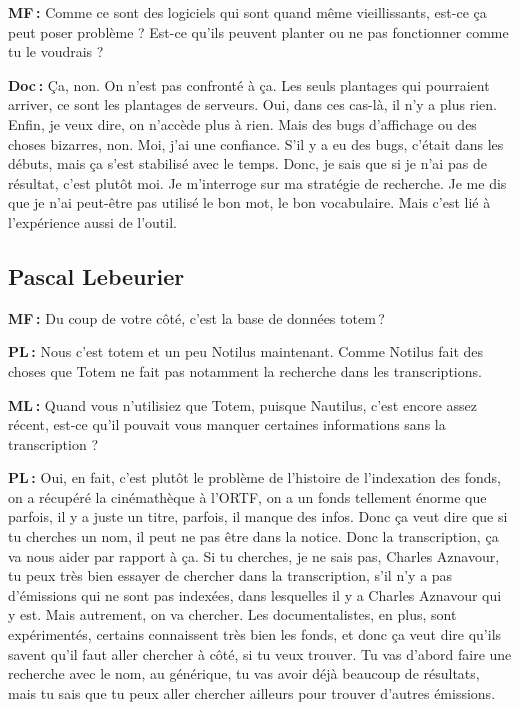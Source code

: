 \textbf{MF :} Comme ce sont des logiciels qui sont quand même vieillissants, est-ce ça peut poser problème ? Est-ce qu'ils peuvent planter ou ne pas fonctionner comme tu le voudrais ? 

\textbf{Doc :} Ça, non.  On n'est pas confronté à ça.  Les seuls plantages qui pourraient arriver, ce sont les plantages de serveurs.  Oui, dans ces cas-là, il n'y a plus rien.  Enfin, je veux dire, on n'accède plus à rien.  Mais des bugs d'affichage ou des choses bizarres, non.  Moi, j'ai une confiance.  S'il y a eu des bugs, c'était dans les débuts, mais ça s'est stabilisé avec le temps. Donc, je sais que si je n'ai pas de résultat, c'est plutôt moi. Je m'interroge sur ma stratégie de recherche.  Je me dis que je n'ai peut-être pas utilisé le bon mot, le bon vocabulaire. Mais c'est lié à l'expérience aussi de l'outil.  

\subsection*{Pascal Lebeurier}

\textbf{MF :} Du coup de votre côté, c'est la base de données totem ? 

\textbf{PL :} Nous c'est totem et un peu Notilus maintenant. Comme Notilus fait des choses que Totem ne fait pas notamment la recherche dans les transcriptions.  

\textbf{ML :} Quand vous n'utilisiez que Totem, puisque Nautilus, c'est encore assez récent, est-ce qu'il pouvait vous manquer certaines informations sans la transcription ? 



\textbf{PL :} Oui, en fait, c'est plutôt le problème de l'histoire de l'indexation des fonds, on a récupéré la cinémathèque à l’ORTF, on a un fonds tellement énorme que parfois, il y a juste un titre, parfois, il manque des infos. Donc ça veut dire que si tu cherches un nom, il peut ne pas être dans la notice. Donc la transcription, ça va nous aider par rapport à ça.  Si tu cherches, je ne sais pas, Charles Aznavour, tu peux très bien essayer de chercher dans la transcription, s'il n'y a pas d'émissions qui ne sont pas indexées, dans lesquelles il y a Charles Aznavour qui y est. Mais autrement, on va chercher. Les documentalistes, en plus, sont expérimentés, certains connaissent très bien les fonds, et donc ça veut dire qu'ils savent qu'il faut aller chercher à côté, si tu veux trouver. Tu vas d'abord faire une recherche avec le nom, au générique, tu vas avoir déjà beaucoup de résultats, mais tu sais que tu peux aller chercher ailleurs pour trouver d'autres émissions. 

